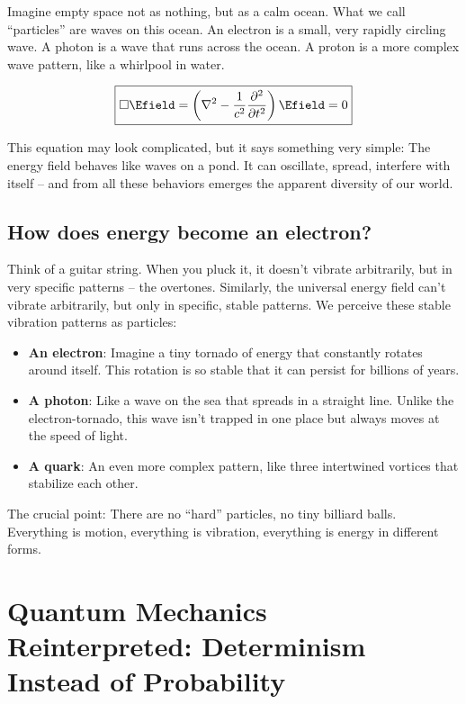 	Imagine empty space not as nothing, but as a calm ocean. What we call ``particles'' are waves on this ocean. An electron is a small, very rapidly circling wave. A photon is a wave that runs across the ocean. A proton is a more complex wave pattern, like a whirlpool in water.
	
	\begin{equation}
		\boxed{\square \Efield = \left(\nabla^2 - \frac{1}{c^2}\frac{\partial^2}{\partial t^2}\right) \Efield = 0}
	\end{equation}
	
	This equation may look complicated, but it says something very simple: The energy field behaves like waves on a pond. It can oscillate, spread, interfere with itself -- and from all these behaviors emerges the apparent diversity of our world.
	
	\subsection{How does energy become an electron?}
	
	Think of a guitar string. When you pluck it, it doesn't vibrate arbitrarily, but in very specific patterns -- the overtones. Similarly, the universal energy field can't vibrate arbitrarily, but only in specific, stable patterns. We perceive these stable vibration patterns as particles:
	
	\begin{itemize}
		\item \textbf{An electron}: Imagine a tiny tornado of energy that constantly rotates around itself. This rotation is so stable that it can persist for billions of years.
		
		\item \textbf{A photon}: Like a wave on the sea that spreads in a straight line. Unlike the electron-tornado, this wave isn't trapped in one place but always moves at the speed of light.
		
		\item \textbf{A quark}: An even more complex pattern, like three intertwined vortices that stabilize each other.
	\end{itemize}
	
	The crucial point: There are no ``hard'' particles, no tiny billiard balls. Everything is motion, everything is vibration, everything is energy in different forms.
	
	\section{Quantum Mechanics Reinterpreted: Determinism Instead of Probability}
	
